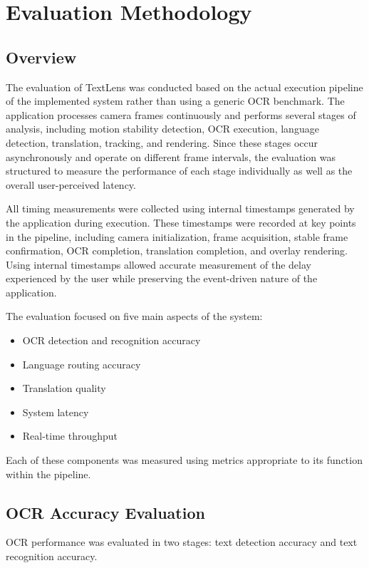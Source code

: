 \chapter{Evaluation Methodology}

\section{Overview}

The evaluation of TextLens was conducted based on the actual execution pipeline of the implemented system rather than using a generic OCR benchmark. The application processes camera frames continuously and performs several stages of analysis, including motion stability detection, OCR execution, language detection, translation, tracking, and rendering. Since these stages occur asynchronously and operate on different frame intervals, the evaluation was structured to measure the performance of each stage individually as well as the overall user-perceived latency.

All timing measurements were collected using internal timestamps generated by the application during execution. These timestamps were recorded at key points in the pipeline, including camera initialization, frame acquisition, stable frame confirmation, OCR completion, translation completion, and overlay rendering. Using internal timestamps allowed accurate measurement of the delay experienced by the user while preserving the event-driven nature of the application.

The evaluation focused on five main aspects of the system:

\begin{itemize}
\item OCR detection and recognition accuracy
\item Language routing accuracy
\item Translation quality
\item System latency
\item Real-time throughput
\end{itemize}

Each of these components was measured using metrics appropriate to its function within the pipeline.

\section{OCR Accuracy Evaluation}

OCR performance was evaluated in two stages: text detection accuracy and text recognition accuracy.

